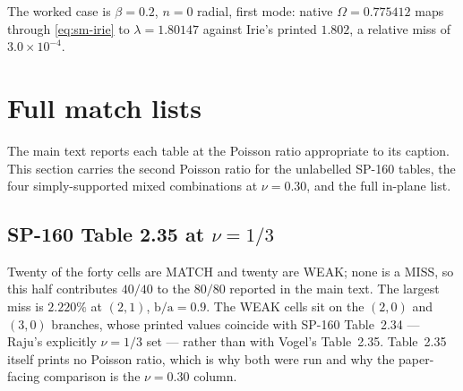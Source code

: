 \documentclass[11pt]{article}
\newcommand{\ba}{\mbox{b/a}}
\begin{document}
The worked case is $\beta=0.2$, $n=0$ radial, first mode: native
$\Omega=0.775412$ maps through \eqref{eq:sm-irie} to $\lambda=1.80147$ against
Irie's printed $1.802$, a relative miss of $3.0\times10^{-4}$.

\section{Full match lists}\label{sec:sm-lists}
The main text reports each table at the Poisson ratio appropriate to its
caption. This section carries the second Poisson ratio for the unlabelled
SP-160 tables, the four simply-supported mixed combinations at $\nu=0.30$,
and the full in-plane list.

\subsection{SP-160 Table 2.35 at \texorpdfstring{$\nu=1/3$}{nu=1/3}}\label{sec:sm-t235}
Twenty of the forty cells are MATCH and twenty are WEAK; none is a MISS, so
this half contributes $40/40$ to the $80/80$ reported in the main text. The
largest miss is $2.220\%$ at $(2,1)$, $\ba=0.9$. The WEAK cells sit on the
$(2,0)$ and $(3,0)$ branches, whose printed values coincide with SP-160
Table~2.34 --- Raju's explicitly $\nu=1/3$ set --- rather than with Vogel's
Table~2.35. Table~2.35 itself prints no Poisson ratio, which is why both were
run and why the paper-facing comparison is the $\nu=0.30$ column.
\end{document}
